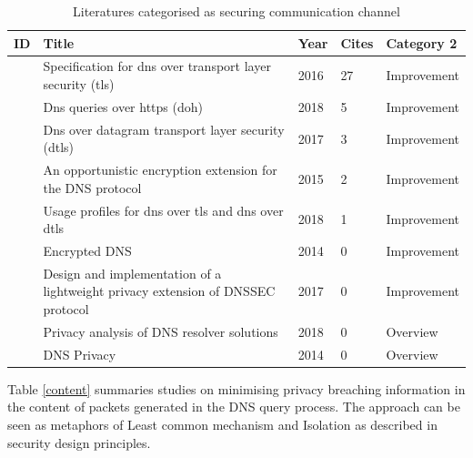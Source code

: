 \documentclass[a4paper,12pt]{article}
\begin{document}
\begin{table}[h!]
    \begin{tabular}{ | l | p{9cm} | l | l | l | }
        \hline
            ID & Title & Year & Cites & Category 2 \\ \hline
            \cite{hu2016specification} & Specification for dns over transport layer security (tls) & 2016 & 27 & Improvement \\ \hline
            \cite{rfc8484} & Dns queries over https (doh) & 2018 & 5 & Improvement \\ \hline
            \cite{reddy2017dns} & Dns over datagram transport layer security (dtls) & 2017 & 3 & Improvement \\ \hline
            \cite{bucuti2015opportunistic} & An opportunistic encryption extension for the DNS protocol & 2015 & 2 & Improvement \\ \hline
            \cite{dickinson2018usage} & Usage profiles for dns over tls and dns over dtls & 2018 & 1 & Improvement \\ \hline
            \cite{bucuti2014encrypted} & Encrypted DNS & 2014 & 0 & Improvement \\ \hline
            \cite{saraj2017design} & Design and implementation of a lightweight privacy extension of DNSSEC protocol & 2017 & 0 & Improvement \\ \hline
            \cite{van2018privacy} & Privacy analysis of DNS resolver solutions & 2018 & 0 & Overview \\ \hline
            \cite{werneck2014dns} & DNS Privacy & 2014 & 0 & Overview \\ \hline
        \end{tabular}
        \caption{Literatures categorised as securing communication channel}
\label{channel}
\end{table}

Table \ref{content} summaries studies on minimising privacy breaching information in the content of packets generated in the DNS query process. The approach can be seen as metaphors of Least common mechanism and Isolation as described in security design principles. 
\end{document}
